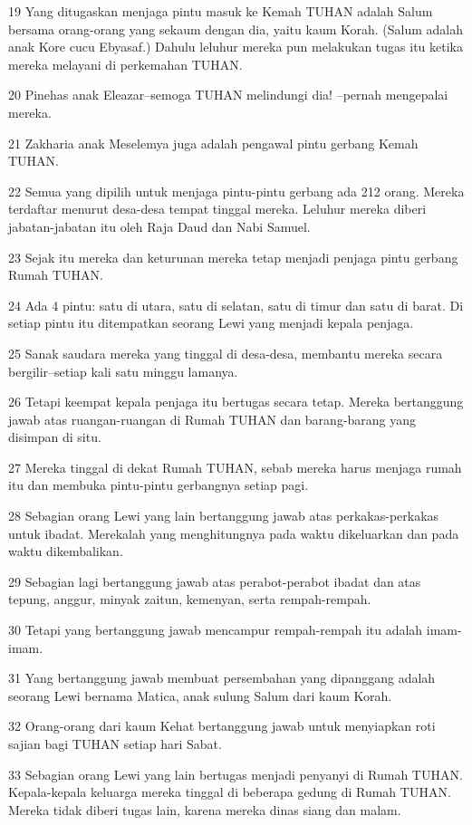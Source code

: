 \par 19 Yang ditugaskan menjaga pintu masuk ke Kemah TUHAN adalah Salum bersama orang-orang yang sekaum dengan dia, yaitu kaum Korah. (Salum adalah anak Kore cucu Ebyasaf.) Dahulu leluhur mereka pun melakukan tugas itu ketika mereka melayani di perkemahan TUHAN.
\par 20 Pinehas anak Eleazar--semoga TUHAN melindungi dia! --pernah mengepalai mereka.
\par 21 Zakharia anak Meselemya juga adalah pengawal pintu gerbang Kemah TUHAN.
\par 22 Semua yang dipilih untuk menjaga pintu-pintu gerbang ada 212 orang. Mereka terdaftar menurut desa-desa tempat tinggal mereka. Leluhur mereka diberi jabatan-jabatan itu oleh Raja Daud dan Nabi Samuel.
\par 23 Sejak itu mereka dan keturunan mereka tetap menjadi penjaga pintu gerbang Rumah TUHAN.
\par 24 Ada 4 pintu: satu di utara, satu di selatan, satu di timur dan satu di barat. Di setiap pintu itu ditempatkan seorang Lewi yang menjadi kepala penjaga.
\par 25 Sanak saudara mereka yang tinggal di desa-desa, membantu mereka secara bergilir--setiap kali satu minggu lamanya.
\par 26 Tetapi keempat kepala penjaga itu bertugas secara tetap. Mereka bertanggung jawab atas ruangan-ruangan di Rumah TUHAN dan barang-barang yang disimpan di situ.
\par 27 Mereka tinggal di dekat Rumah TUHAN, sebab mereka harus menjaga rumah itu dan membuka pintu-pintu gerbangnya setiap pagi.
\par 28 Sebagian orang Lewi yang lain bertanggung jawab atas perkakas-perkakas untuk ibadat. Merekalah yang menghitungnya pada waktu dikeluarkan dan pada waktu dikembalikan.
\par 29 Sebagian lagi bertanggung jawab atas perabot-perabot ibadat dan atas tepung, anggur, minyak zaitun, kemenyan, serta rempah-rempah.
\par 30 Tetapi yang bertanggung jawab mencampur rempah-rempah itu adalah imam-imam.
\par 31 Yang bertanggung jawab membuat persembahan yang dipanggang adalah seorang Lewi bernama Matica, anak sulung Salum dari kaum Korah.
\par 32 Orang-orang dari kaum Kehat bertanggung jawab untuk menyiapkan roti sajian bagi TUHAN setiap hari Sabat.
\par 33 Sebagian orang Lewi yang lain bertugas menjadi penyanyi di Rumah TUHAN. Kepala-kepala keluarga mereka tinggal di beberapa gedung di Rumah TUHAN. Mereka tidak diberi tugas lain, karena mereka dinas siang dan malam.
